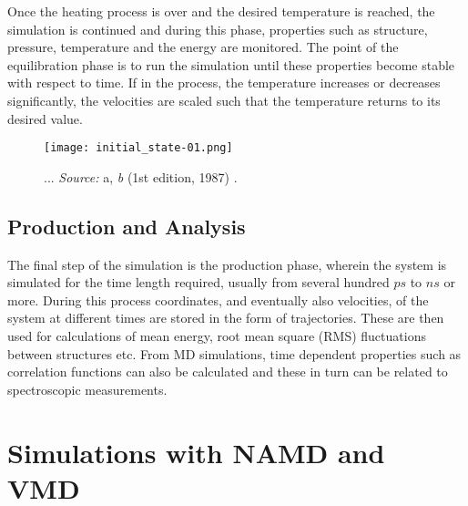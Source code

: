 Once the heating process is over and the desired temperature is reached, the simulation is continued and during this phase, properties such as structure, pressure, temperature and the energy are monitored. The point of the equilibration phase is to run the simulation until these properties become stable with respect to time. If in the process, the temperature increases or decreases significantly, the velocities are scaled such that the temperature returns to its desired value.

\begin{figure}[H]
\centering
\begin{minipage}[t]{0.8\textwidth}
	\centering
    \texttt{[image: initial\_state-01.png]}
    
    \footnotesize{\caption{...
    \textit{Source:} a, \textit{b} (1st edition, 1987) 
    \cite{ref:AllenTildesley_1ed}.}
    \label{fig:symplettic-integrator}
    }
\end{minipage} 
\end{figure}

\subsection{Production and Analysis}

The final step of the simulation is the production phase, wherein the system is simulated for the time length required, usually from several hundred $ps$ to $ns$ or more. During this process coordinates,  and eventually also velocities, of the system at different times are stored in the form of trajectories. These are then used for calculations of mean energy, root mean square (RMS) fluctuations between structures etc. From MD simulations, time dependent properties such as correlation functions can also be calculated and these in turn can be related to spectroscopic measurements.


\section{Simulations with NAMD and VMD}


